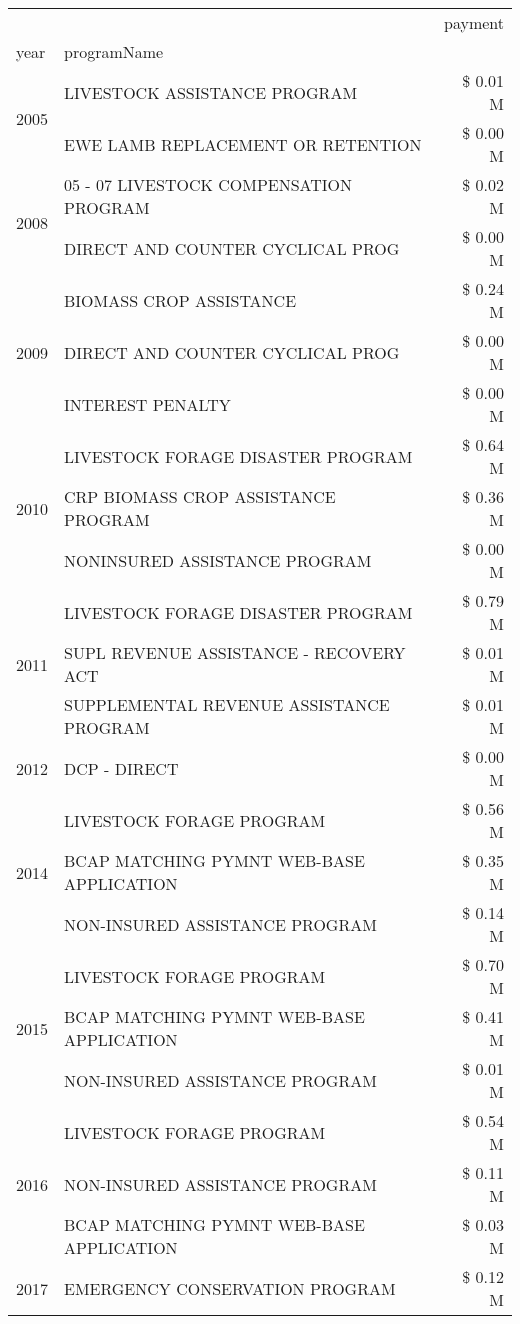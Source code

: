 \begin{tabular}{llr}
\toprule
 &  & payment \\
year & programName &  \\
\midrule
\multirow[t]{2}{*}{2005} & LIVESTOCK ASSISTANCE PROGRAM & \$ 0.01 M \\
 & EWE LAMB REPLACEMENT OR RETENTION & \$ 0.00 M \\
\cline{1-3}
\multirow[t]{2}{*}{2008} & 05 - 07 LIVESTOCK COMPENSATION PROGRAM & \$ 0.02 M \\
 & DIRECT AND COUNTER CYCLICAL PROG & \$ 0.00 M \\
\cline{1-3}
\multirow[t]{3}{*}{2009} & BIOMASS CROP ASSISTANCE & \$ 0.24 M \\
 & DIRECT AND COUNTER CYCLICAL PROG & \$ 0.00 M \\
 & INTEREST PENALTY & \$ 0.00 M \\
\cline{1-3}
\multirow[t]{3}{*}{2010} & LIVESTOCK FORAGE DISASTER PROGRAM & \$ 0.64 M \\
 & CRP BIOMASS CROP ASSISTANCE PROGRAM & \$ 0.36 M \\
 & NONINSURED ASSISTANCE PROGRAM & \$ 0.00 M \\
\cline{1-3}
\multirow[t]{3}{*}{2011} & LIVESTOCK FORAGE DISASTER PROGRAM & \$ 0.79 M \\
 & SUPL REVENUE ASSISTANCE - RECOVERY ACT & \$ 0.01 M \\
 & SUPPLEMENTAL REVENUE ASSISTANCE PROGRAM & \$ 0.01 M \\
\cline{1-3}
2012 & DCP - DIRECT & \$ 0.00 M \\
\cline{1-3}
\multirow[t]{3}{*}{2014} & LIVESTOCK FORAGE PROGRAM & \$ 0.56 M \\
 & BCAP MATCHING PYMNT WEB-BASE APPLICATION & \$ 0.35 M \\
 & NON-INSURED ASSISTANCE PROGRAM & \$ 0.14 M \\
\cline{1-3}
\multirow[t]{3}{*}{2015} & LIVESTOCK FORAGE PROGRAM & \$ 0.70 M \\
 & BCAP MATCHING PYMNT WEB-BASE APPLICATION & \$ 0.41 M \\
 & NON-INSURED ASSISTANCE PROGRAM & \$ 0.01 M \\
\cline{1-3}
\multirow[t]{3}{*}{2016} & LIVESTOCK FORAGE PROGRAM & \$ 0.54 M \\
 & NON-INSURED ASSISTANCE PROGRAM & \$ 0.11 M \\
 & BCAP MATCHING PYMNT WEB-BASE APPLICATION & \$ 0.03 M \\
\cline{1-3}
\multirow[t]{3}{*}{2017} & EMERGENCY CONSERVATION PROGRAM & \$ 0.12 M \\

\end{tabular}
